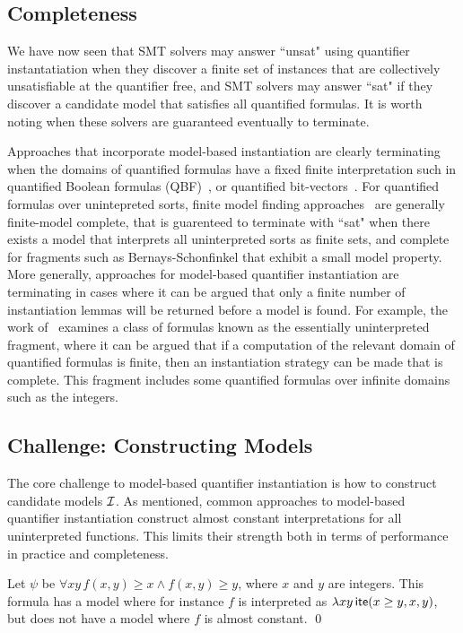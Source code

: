 \documentclass[oribibl]{llncs}
\begin{document}
\subsection{Completeness}
We have now seen that SMT solvers may answer ``unsat" using quantifier instantatiation
when they discover a finite set of instances that are collectively unsatisfiable at the quantifier free,
and SMT solvers may answer ``sat" if they discover a candidate model that satisfies all quantified formulas.
It is worth noting when these solvers are guaranteed eventually to terminate.

Approaches that incorporate model-based instantiation are clearly terminating
when the domains of quantified formulas have a fixed finite interpretation
such in quantified Boolean formulas (QBF)~\cite{},
or quantified bit-vectors~\cite{}.
For quantified formulas over unintepreted sorts,
finite model finding approaches~\cite{} are generally finite-model complete,
that is guarenteed to terminate with ``sat" when there exists a model that interprets
all uninterpreted sorts as finite sets, and complete for fragments such as Bernays-Schonfinkel
that exhibit a small model property.
More generally, approaches for model-based quantifier instantiation are terminating in cases
where it can be argued that only a finite number of instantiation lemmas will be returned before 
a model is found.
For example, the work of~\cite{} examines a class of formulas known as the essentially uninterpreted fragment,
where it can be argued that if a computation of the relevant domain of quantified formulas is finite,
then an instantiation strategy can be made that is complete.
This fragment includes some quantified formulas over infinite domains such as the integers.

\subsection{Challenge: Constructing Models}
The core challenge to model-based quantifier instantiation is how to construct candidate models $\mathcal{I}$.
As mentioned, common approaches to model-based quantifier instantiation
construct almost constant interpretations for all uninterpreted functions.
This limits their strength both in terms of performance in practice and completeness.

\begin{example}
Let $\psi$ be $\forall xy\, f( x, y ) \geq x \wedge f( x, y ) \geq y$, where $x$ and $y$ are integers.
This formula has a model where for instance $f$ is interpreted as $\lambda xy\, \mathsf{ite}( x \geq y, x, y )$,
but does not have a model where $f$ is almost constant.
\qed
\end{example}
\end{document}
